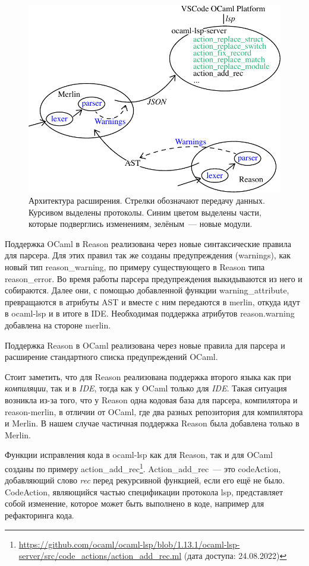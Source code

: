 \begin{figure}[h]
	\includegraphics[width=\linewidth]{graph.pdf}
\caption{Архитектура расширения. Стрелки обозначают передачу данных. Курсивом выделены протоколы. Синим цветом выделены части, которые подверглись изменениям, зелёным~--- новые модули.}
\end{figure}
Поддержка OCaml в Reason реализована через новые синтаксические правила для парсера. Для этих правил так же созданы предупреждения (warnings), как новый тип reason\_warning, по примеру существующего в Reason типа reason\_error. Во время работы парсера предупреждения выкидываются из него и собираются. Далее они, с помощью добавленной функции warning\_attribute, превращаются в атрибуты AST и вместе с ним передаются в merlin, откуда идут в ocaml-lsp и в итоге в IDE. Необходимая поддержка атрибутов reason.warning добавлена на стороне merlin.

Поддержка Reason в OCaml реализована через новые правила для парсера и расширение стандартного списка предупреждений OCaml.

Стоит заметить, что для Reason реализована поддержка второго языка как при {\it компиляции}, так и в {\it IDE}, тогда как у OCaml только для {\it IDE}. Такая ситуация возникла из-за того, что у Reason одна кодовая база для парсера, компилятора и reason-merlin, в отличии от OCaml, где два разных репозитория для компилятора и Merlin. В нашем случае частичная поддержка Reason была добавлена только в Merlin.

Функции исправления кода в ocaml-lsp как для Reason, так и для OCaml созданы по примеру action\_add\_rec\footnote{ \url{https://github.com/ocaml/ocaml-lsp/blob/1.13.1/ocaml-lsp-server/src/code_actions/action_add_rec.ml} (дата доступа: 24.08.2022) }. Action\_add\_rec~--- это code\-Action, добавляющий слово {\it rec} перед рекурсивной функцией, если его ещё не было. CodeAction, являющийся частью спецификации протокола lsp, представляет собой изменение, которое может быть выполнено в коде, например для рефакторинга кода.
\newpage
